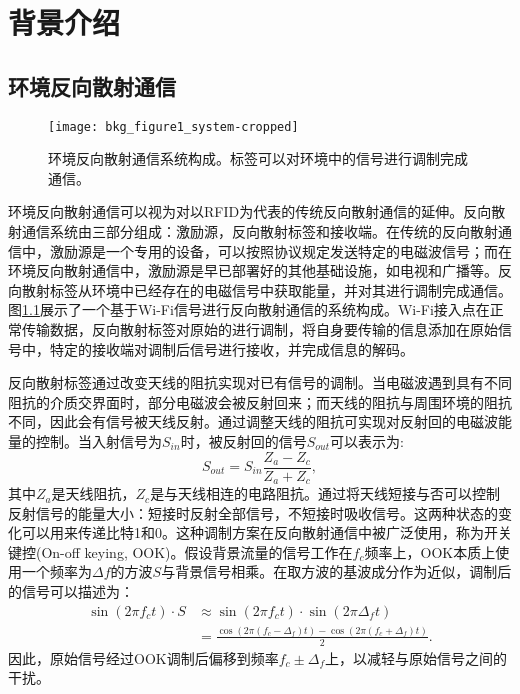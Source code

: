 \chapter{背景介绍}
\label{chap:background}
\section{环境反向散射通信}
\begin{figure}
	\centering
	\texttt{[image: bkg\_figure1\_system-cropped]}
	\caption{环境反向散射通信系统构成。标签可以对环境中的信号进行调制完成通信。}
	\label{fig:system}
\end{figure}
环境反向散射通信可以视为对以RFID为代表的传统反向散射通信的延伸。反向散射通信系统由三部分组成：激励源，反向散射标签和接收端。在传统的反向散射通信中，激励源是一个专用的设备，可以按照协议规定发送特定的电磁波信号；而在环境反向散射通信中，激励源是早已部署好的其他基础设施，如电视和广播等。反向散射标签从环境中已经存在的电磁信号中获取能量，并对其进行调制完成通信。图\ref{fig:system}展示了一个基于Wi-Fi信号进行反向散射通信的系统构成。Wi-Fi接入点在正常传输数据，反向散射标签对原始的进行调制，将自身要传输的信息添加在原始信号中，特定的接收端对调制后信号进行接收，并完成信息的解码。

反向散射标签通过改变天线的阻抗实现对已有信号的调制。当电磁波遇到具有不同阻抗的介质交界面时，部分电磁波会被反射回来；而天线的阻抗与周围环境的阻抗不同，因此会有信号被天线反射。通过调整天线的阻抗可实现对反射回的电磁波能量的控制。当入射信号为$S_{in}$时，被反射回的信号$S_{out}$可以表示为:
\begin{equation}
S_{out} = S_{in} \frac{Z_a - Z_c}{Z_a + Z_c},
\end{equation}
其中$Z_a$是天线阻抗，$Z_c$是与天线相连的电路阻抗。通过将天线短接与否可以控制反射信号的能量大小：短接时反射全部信号，不短接时吸收信号。这两种状态的变化可以用来传递比特1和0。这种调制方案在反向散射通信中被广泛使用，称为开关键控(On-off keying, OOK)。假设背景流量的信号工作在$f_c$频率上，OOK本质上使用一个频率为$\Delta f$的方波$S$与背景信号相乘。在取方波的基波成分作为近似，调制后的信号可以描述为：
\begin{equation}
\begin{split}
	\sin(2\pi f_c t)\cdot S &\approx \sin(2\pi f_c t)\cdot \sin(2\pi \Delta_f t)\\
	& =\frac{\cos (2\pi (f_c - \Delta_f)t) - \cos (2\pi (f_c + \Delta_f)t)}{2}.
\end{split}
\end{equation}
因此，原始信号经过OOK调制后偏移到频率$f_c \pm \Delta_f$上，以减轻与原始信号之间的干扰。


